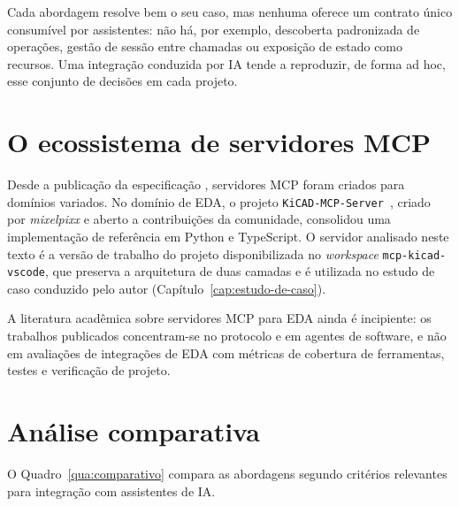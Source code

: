 Cada abordagem resolve bem o seu caso, mas nenhuma oferece um contrato único
consumível por assistentes: não há, por exemplo, descoberta padronizada de
operações, gestão de sessão entre chamadas ou exposição de estado como
recursos. Uma integração conduzida por IA tende a reproduzir, de forma ad hoc,
esse conjunto de decisões em cada projeto.

\section{O ecossistema de servidores MCP}

Desde a publicação da especificação \citep{mcp2025spec}, servidores MCP foram
criados para domínios variados. No domínio de EDA, o projeto
\texttt{KiCAD-MCP-Server}~\citep{kicadmcpserver}, criado por \emph{mixelpixx}
e aberto a contribuições da comunidade, consolidou uma implementação de
referência em Python e TypeScript. O servidor analisado neste texto é a versão
de trabalho do projeto disponibilizada no \emph{workspace}
\texttt{mcp-kicad-vscode}, que preserva a arquitetura de duas camadas e é
utilizada no estudo de caso conduzido pelo autor
(Capítulo~\ref{cap:estudo-de-caso}).

A literatura acadêmica sobre servidores MCP para EDA ainda é incipiente: os
trabalhos publicados concentram-se no protocolo e em agentes de software, e
não em avaliações de integrações de EDA com métricas de cobertura de
ferramentas, testes e verificação de projeto.

\section{Análise comparativa}

O Quadro~\ref{qua:comparativo} compara as abordagens segundo critérios
relevantes para integração com assistentes de IA.

